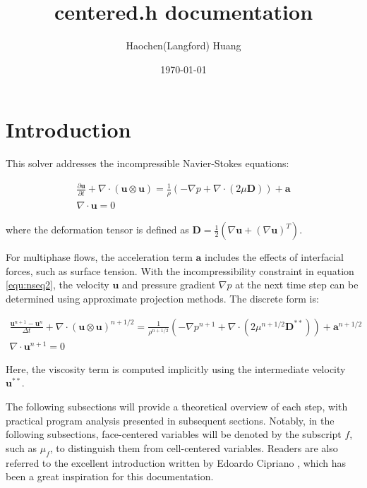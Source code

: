 \documentclass[a4paper]{article}
\title{centered.h documentation}
\author{Haochen(Langford) Huang}
\date{\today}
\begin{document}
\maketitle
\section{Introduction}
This solver addresses the incompressible Navier-Stokes equations\cite{2003_Popinet,2015_Popinet}:

\begin{gather}
    \frac{\partial \mathbf{u}}{\partial t} 
    + \nabla \cdot (\mathbf{u} \otimes \mathbf{u}) 
    = \frac{1}{\rho} \left(-\nabla p + \nabla \cdot (2\mu \mathbf{D})\right) 
    + \mathbf{a}
    \label{equ:nseq1} \\
    \nabla \cdot \mathbf{u} = 0 
    \label{equ:nseq2}
\end{gather}

where the deformation tensor is defined as 
$
\mathbf{D} = \frac{1}{2} (\nabla \mathbf{u} + (\nabla \mathbf{u})^T)
$.

For multiphase flows, the acceleration term $\mathbf{a}$ includes the effects of interfacial forces, such as surface tension. With the incompressibility constraint in equation \ref{equ:nseq2}, the velocity $\mathbf{u}$ and pressure gradient $\nabla p$ at the next time step can be determined using approximate projection methods. The discrete form is:

\begin{gather}
    \frac{\mathbf{u}^{n+1} - \mathbf{u}^n}{\Delta t} 
    + \nabla \cdot (\mathbf{u} \otimes \mathbf{u})^{n+1/2} 
    = \frac{1}{\rho^{n+1/2}} \left(-\nabla p^{n+1} 
    + \nabla \cdot \left(2\mu^{n+1/2} \mathbf{D}^{**}\right)\right) 
    + \mathbf{a}^{n+1/2}
    \label{equ:nseqdes1} \\
    \nabla \cdot \mathbf{u}^{n+1} = 0 \label{equ:nseqdes2}
\end{gather}

Here, the viscosity term is computed implicitly using the intermediate velocity $\mathbf{u}^{**}$.

The following subsections will provide a theoretical overview of each step, with practical program analysis presented in subsequent sections. Notably, in the following subsections, face-centered variables will be denoted by the subscript $f$, such as $\mu_f$, to distinguish them from cell-centered variables. Readers are also referred to the excellent introduction written by Edoardo Cipriano \cite{2024_Cipriano}, which has been a great inspiration for this documentation.
\end{document}
